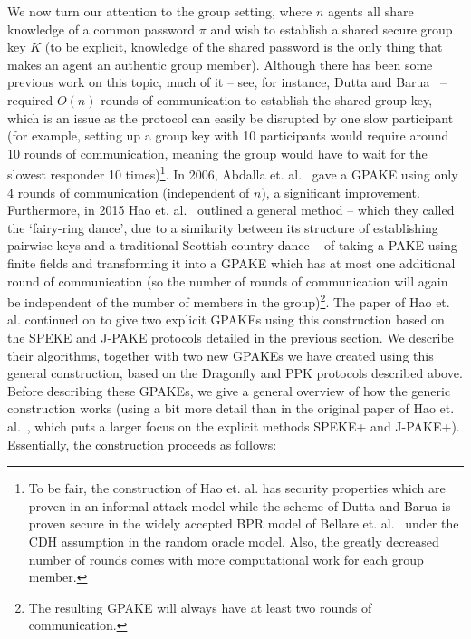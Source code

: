 We now turn our attention to the group setting, where $n$ agents all share knowledge of a common password $\pi$ and wish to establish a shared secure group key $K$ (to be explicit, knowledge of the shared password is the only thing that makes an agent an authentic group member).  Although there has been some previous work on this topic, much of it -- see, for instance, Dutta and Barua~\cite{DuBa06} -- required $O(n)$ rounds of communication to establish the shared group key, which is an issue as the protocol can easily be disrupted by one slow participant (for example, setting up a group key with 10 participants would require around 10 rounds of communication, meaning the group would have to wait for the slowest responder 10 times)\footnote{To be fair, the construction of Hao et. al. has security properties which are proven in an informal attack model while the scheme of Dutta and Barua is proven secure in the widely accepted BPR model of Bellare et. al.~\cite{BePoRo00} under the CDH assumption in the random oracle model.  Also, the greatly decreased number of rounds comes with more computational work for each group member.}.  In 2006, Abdalla et. al.~\cite{AbBrChPo06} gave a GPAKE using only 4 rounds of communication (independent of $n$), a significant improvement.  Furthermore, in 2015 Hao et. al.~\cite{HaYiChSh15} outlined a general method -- which they called the `fairy-ring dance', due to a similarity between its structure of establishing pairwise keys and a traditional Scottish country dance -- of taking a PAKE using finite fields and transforming it into a GPAKE which has at most one additional round of communication (so the number of rounds of communication will again be independent of the number of members in the group)\footnote{The resulting GPAKE will always have at least two rounds of communication.}.  The paper of Hao et. al. continued on to give two explicit GPAKEs using this construction based on the SPEKE and J-PAKE protocols detailed in the previous section.  We describe their algorithms, together with two new GPAKEs we have created using this general construction, based on the Dragonfly and PPK protocols described above.
\\

Before describing these GPAKEs, we give a general overview of how the generic construction works (using a bit more detail than in the original paper of Hao et. al.~\cite{HaYiChSh15}, which puts a larger focus on the explicit methods SPEKE+ and J-PAKE+).  Essentially, the construction proceeds as follows:
\\

